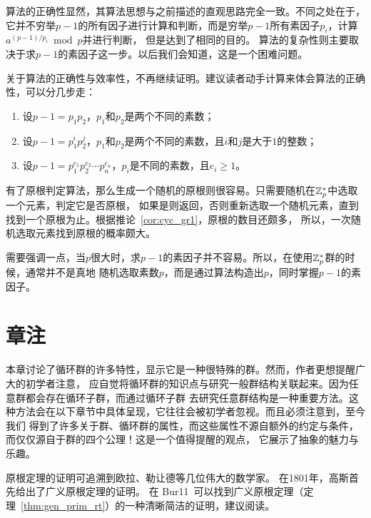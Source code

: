 算法的正确性显然，其算法思想与之前描述的直观思路完全一致。不同之处在于，
它并不穷举$p-1$的所有因子进行计算和判断，而是穷举$p-1$所有素因子$p_i$，计算$a^{(p-1)/p_i} \bmod p$并进行判断，
但是达到了相同的目的。
算法的复杂性则主要取决于求$p-1$的素因子这一步。以后我们会知道，这是一个困难问题。

关于算法的正确性与效率性，不再继续证明。建议读者动手计算来体会算法的正确性，可以分几步走：
\begin{enumerate}
\item 设$p-1 = p_1 p_2$，$p_1$和$p_2$是两个不同的素数；

\item 设$p-1 = p_1^i p_2^j$，$p_1$和$p_2$是两个不同的素数，且$i$和$j$是大于$1$的整数；

\item 设$p-1 = p_1^{e_1} p_2^{e_2}\cdots p_n^{e_n}$，$p_i$是不同的素数，且$e_i \ge 1$。
\end{enumerate}

有了原根判定算法，那么生成一个随机的原根则很容易。只需要随机在${\mathbb Z}_p^*$中选取一个元素，判定它是否原根，
如果是则返回，否则重新选取一个随机元素，直到找到一个原根为止。根据推论~\ref{cor:cyc_gr1}，原根的数目还颇多，
所以，一次随机选取元素找到原根的概率颇大。

需要强调一点，当$p$很大时，求$p-1$的素因子并不容易。所以，在使用${\mathbb Z}_p^*$群的时候，通常并不是真地
随机选取素数$p$，而是通过算法构造出$p$，同时掌握$p-1$的素因子。

\section*{章注}
本章讨论了循环群的许多特性，显示它是一种很特殊的群。然而，作者更想提醒广大的初学者注意，
应自觉将循环群的知识点与研究一般群结构关联起来。因为任意群都会存在循环子群，而通过循环子群
去研究任意群结构是一种重要方法。这种方法会在以下章节中具体呈现，它往往会被初学者忽视。而且必须注意到，至今我们
得到了许多关于群、循环群的属性，而这些属性不源自额外的约定与条件，而仅仅源自于群的四个公理！这是一个值得提醒的观点，
它展示了抽象的魅力与乐趣。

原根定理的证明可追溯到欧拉、勒让德等几位伟大的数学家。
在1801年，高斯首先给出了广义原根定理的证明。
在 Bur11~\cite{Bur11}可以找到广义原根定理（定理~\ref{thm:gen_prim_rt}）的一种清晰简洁的证明，建议阅读。


